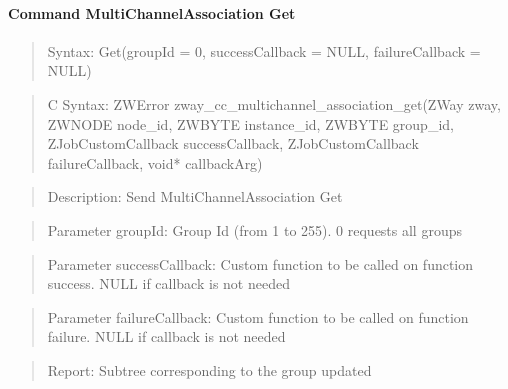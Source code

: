 \paragraph{Command MultiChannelAssociation Get}
\begin{quote}Syntax: Get(groupId = 0, successCallback = NULL, failureCallback = NULL)\end{quote}
\begin{quote}C Syntax: ZWError zway\_cc\_multichannel\_association\_get(ZWay zway, ZWNODE node\_id, ZWBYTE instance\_id, ZWBYTE group\_id, ZJobCustomCallback successCallback, ZJobCustomCallback failureCallback, void* callbackArg)\end{quote}
\begin{quote}Description: Send MultiChannelAssociation Get\end{quote}
\begin{quote}Parameter groupId: Group Id (from 1 to 255). 0 requests all groups\end{quote}
\begin{quote}Parameter successCallback: Custom function to be called on function success. NULL if callback is not needed\end{quote}
\begin{quote}Parameter failureCallback: Custom function to be called on function failure. NULL if callback is not needed\end{quote}
\begin{quote}Report: Subtree corresponding to the group updated\end{quote}

